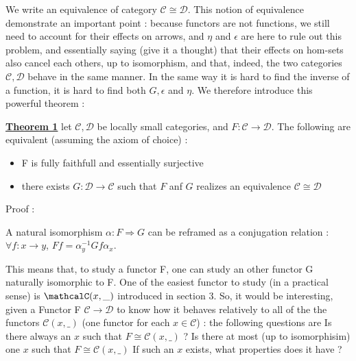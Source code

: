 \documentclass{article}
\begin{document}
\noindent We write an equivalence of category $\mathcal{C} \cong \mathcal{D}$.  \newline \newline 
This notion of equivalence demonstrate an important point : \newline
because functors are not functions, we still need to account for their effects on arrows, and $\eta$ and $\epsilon$ are here to rule out this problem, and essentially saying (give it a thought) that their effects on hom-sets also cancel each others, up to isomorphism, and that, indeed, the two categories $\mathcal{C, D}$ behave in the same manner. In the same way it is hard to find the inverse of a function, it is hard to find both $G, \epsilon$ and $\eta$. We therefore introduce this powerful theorem : \newline \newline \newline 

\noindent \large \underline{\textbf{Theorem 1}} \newline \normalsize \newline
let $\mathcal{C, D}$ be locally small categories, and $F : \mathcal{C \rightarrow D}$. The following are equivalent (assuming the axiom of choice) :  
\begin{itemize}[noitemsep]
    \item F is fully faithfull and essentially surjective
    \item there exists $G : \mathcal{D \rightarrow C}$ such that $F$ anf $G$ realizes an equivalence $\mathcal{C} \cong \mathcal{D}$
\end{itemize}

\noindent Proof : \newline \newline \newline 

\noindent A natural isomorphism $\alpha : F \Rightarrow G$ can be reframed as a conjugation relation : \newline
$\forall f : x \rightarrow y$, 
$Ff = \alpha^{-1}_{y} Gf \alpha_{x}$. \newline

This means that, to study a functor F, one can study an other functor G naturally isomorphic to F. One of the easiest functor to study (in a practical sense) is $\mathcalC(x, \_)$ introduced in section 3. So, it would be interesting, given a Functor F $ \mathcal{C \rightarrow D}$ to know how it behaves relatively to all of the the functors $\mathcal{C}(x, \_)$ (one functor for each $x \in \mathcal{C}$) : the following questions are \newline
Is there always an $x$ such that $F \cong \mathcal{C}(x, \_)$ ? \newline
Is there at most (up to isomorphisim) one $x$ such that $F \cong \mathcal{C}(x, \_)$ \newline
If such an $x$ exists, what properties does it have ? \newline
\end{document}
